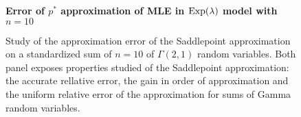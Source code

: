 \begin{example}

    \begin{figure}[!htbp]
        \textbf{Error of $p^*$ approximation of MLE in ${\textrm{Exp}}(\lambda)$ model with $n=10$}
        \centering
        \caption{Study of the approximation error of the Saddlepoint approximation on a standardized sum of $n=10$ of $\Gamma(2, 1)$ random variables. Both panel exposes properties studied of the Saddlepoint approximation: the accurate rellative error, the gain in order of approximation and the uniform relative error of the approximation for sums of Gamma random variables.}
        \label{fig-pstar-approx}
    \end{figure}    


\end{example}
